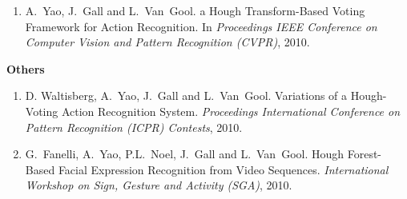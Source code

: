 \begin{publications}
\begin{enumerate}
\item
A.~Yao, J.~Gall and L.~Van~Gool.  a Hough Transform-Based Voting Framework
for Action Recognition. In {\em Proceedings IEEE Conference on Computer Vision
and Pattern Recognition (CVPR)}, 2010. \\

\end{enumerate}

{\large\textbf{Others}} \\
\begin{enumerate}
\item 
D. Waltisberg, A.~Yao, J.~Gall and L.~Van~Gool.  Variations of a Hough-Voting
Action Recognition System.  {\em Proceedings International Conference on Pattern
Recognition (ICPR) Contests}, 2010.

\item
G.~Fanelli, A.~Yao, P.L.~Noel, J.~Gall and L.~Van~Gool.  Hough Forest-Based
Facial Expression Recognition from Video Sequences.  {\em International
Workshop on Sign, Gesture and Activity (SGA)},
2010.
\end{enumerate}

\end{publications}